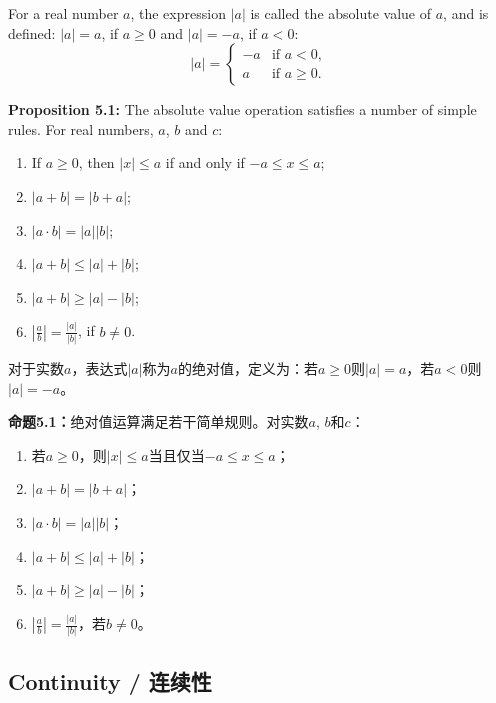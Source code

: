 \begin{original}
For a real number $a$, the expression $|a|$ is called the absolute value of $a$, and is defined: $|a| = a$, if $a \ge 0$ and $|a| = -a$, if $a < 0$:
\[
|a| = \begin{cases} -a & \text{if } a < 0, \\ a & \text{if } a \ge 0. \end{cases}
\]

\textbf{Proposition 5.1:} The absolute value operation satisfies a number of simple rules. For real numbers, $a$, $b$ and $c$:
\begin{enumerate}
\item If $a \ge 0$, then $|x| \le a$ if and only if $-a \le x \le a$;
\item $|a + b| = |b + a|$;
\item $|a \cdot b| = |a||b|$;
\item $|a + b| \le |a| + |b|$;
\item $|a + b| \ge |a| - |b|$;
\item $|\frac{a}{b}| = \frac{|a|}{|b|}$, if $b \neq 0$.
\end{enumerate}
\end{original}
\begin{translation}
对于实数$a$，表达式$|a|$称为$a$的绝对值，定义为：若$a \ge 0$则$|a| = a$，若$a < 0$则$|a| = -a$。

\textbf{命题5.1：}绝对值运算满足若干简单规则。对实数$a$, $b$和$c$：
\begin{enumerate}
\item 若$a \ge 0$，则$|x| \le a$当且仅当$-a \le x \le a$；
\item $|a + b| = |b + a|$；
\item $|a \cdot b| = |a||b|$；
\item $|a + b| \le |a| + |b|$；
\item $|a + b| \ge |a| - |b|$；
\item $|\frac{a}{b}| = \frac{|a|}{|b|}$，若$b \neq 0$。
\end{enumerate}
\end{translation}

\subsection{Continuity / 连续性}

